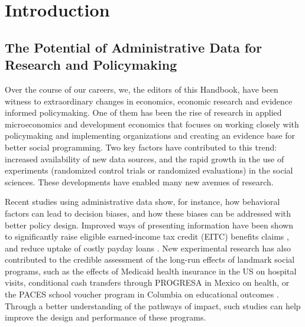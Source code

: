 \hypertarget{intro}{%
\chapter{Introduction}\label{intro}}

\hrulefill

\hypertarget{the-potential-of-administrative-data-for-research-and-policymaking}{%
\section{The Potential of Administrative Data for Research and Policymaking}\label{the-potential-of-administrative-data-for-research-and-policymaking}}

Over the course of our careers, we, the editors of this Handbook, have been witness to extraordinary changes in economics, economic research and evidence informed policymaking. One of them has been the rise of research in applied microeconomics and development economics that focuses on working closely with policymaking and implementing organizations and creating an evidence base for better social programming. Two key factors have contributed to this trend: increased availability of new data sources, and the rapid growth in the use of experiments (randomized control trials or randomized evaluations) in the social sciences. These developments have enabled many new avenues of research.

Recent studies using administrative data show, for instance, how behavioral factors can lead to decision biases, and how these biases can be addressed with better policy design. Improved ways of presenting information have been shown to significantly raise eligible earned-income tax credit (EITC) benefits claims \citep{bhargava2015}, and reduce uptake of costly payday loans \citep{bertrand2011}. New experimental research has also contributed to the credible assessment of the long-run effects of landmark social programs, such as the effects of Medicaid health insurance in the US on hospital visits, conditional cash transfers through PROGRESA in Mexico on health, or the PACES school voucher program in Columbia on educational outcomes \citep{taubman2014, gertler2003, angrist2006}. Through a better understanding of the pathways of impact, such studies can help improve the design and performance of these programs.

